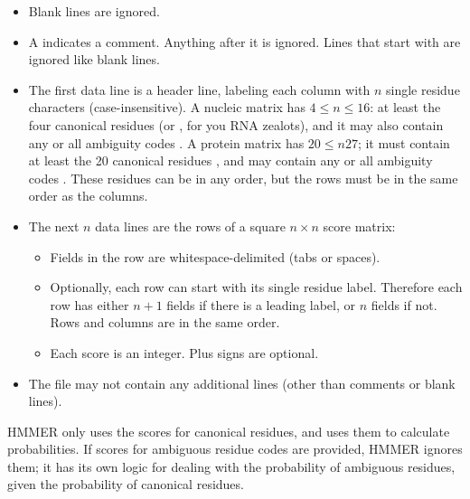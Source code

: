 \begin{itemize}

\item Blank lines are ignored.

\item A \prog{\#} indicates a comment. Anything after it is
  ignored. Lines that start with \prog{\#} are ignored like blank
  lines.

\item The first data line is a header line, labeling each column with
  $n$ single residue characters (case-insensitive). A nucleic matrix
  has $4 \leq n \leq 16$: at least the four canonical residues
   (or , for you RNA zealots), and it may also
  contain any or all ambiguity codes . A protein
  matrix has $20 \leq n 27$; it must contain at least the 20 canonical
  residues , and may contain any or all
  ambiguity codes . These residues can be in any order,
  but the rows must be in the same order as the columns.

\item The next $n$ data lines are the rows of a square $n \times n$
  score matrix:

\begin{itemize}
\item  Fields in the row are whitespace-delimited (tabs or
       spaces).

\item Optionally, each row can start with its single residue label.
  Therefore each row has either $n+1$ fields if there is a leading
  label, or $n$ fields if not. Rows and columns are in the same order.

\item  Each score is an integer. Plus signs are optional. 
\end{itemize}

\item The file may not contain any additional lines (other than
  comments or blank lines).
\end{itemize}

HMMER only uses the scores for canonical residues, and uses them to
calculate probabilities. If scores for ambiguous residue codes are
provided, HMMER ignores them; it has its own logic for dealing with
the probability of ambiguous residues, given the probability of
canonical residues.






  
